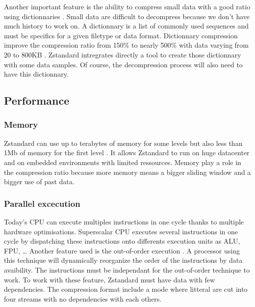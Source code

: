 \documentclass{sig-alternate-05-2015}
\begin{document}
    Another important feature is the ability to compress small data with a good ratio using
    dictionnaries \cite{dictionnary}. Small data are difficult to decompress because we don't have
    much history to work on. A dictionnary is a list of commonly used sequences and must be
    specifics for a given filetype or data format. Dictionnary compression improve the compression
    ratio from 150\% to nearly 500\% with data varying from 20 to 800KB \cite{dictionnary}.
    Zstandard intregrates directly a tool to create those dictionnary with some data samples. Of
    course, the decompression process will also need to have this dictionnary.

    \subsection{Performance}\label{sec:perf}
    \subsubsection{Memory}
        Zstandard can use up to terabytes of memory for some levels but also less than 1Mb of memory
        for the first level \cite{presentation}. It allows Zstandard to run on huge datacenter and on
        embedded environments with limited ressources. Memory play a role in the compression ratio
        because more memory means a bigger sliding window and a bigger use of past data.

    \subsubsection{Parallel excecution}
        Today's CPU can execute multiples instructions in one cycle thanks to multiple hardware
        optimisations. Superscalar CPU \cite{superscalar} executes several instructions in one cycle
        by dispatching these instructions onto differents execution units as ALU, FPU, \ldots{}
        Another feature used is the out-of-order execution \cite{outoforder}. A processor using this
        technique will dynamically reorganize the order of the instructions by data avaibility. The
        instructions must be independant for the out-of-order technique to work. To work with these
        feature, Zstandard must have data with few dependencies. The compression format include a
        mode where litteral are cut into four streams with no dependencies with each others.
\end{document}

